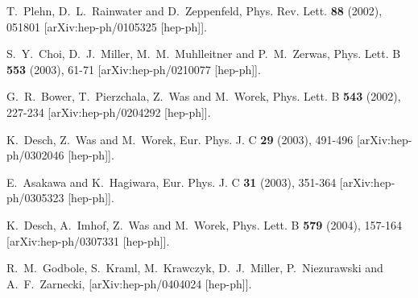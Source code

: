 \documentclass[pdftex,twocolumn,epjc3]{svjour3}          %
\begin{document}
\begin{thebibliography}{9}
T.~Plehn, D.~L.~Rainwater and D.~Zeppenfeld,
Phys. Rev. Lett. \textbf{88} (2002), 051801
[arXiv:hep-ph/0105325 [hep-ph]].

S.~Y.~Choi, D.~J.~Miller, M.~M.~Muhlleitner and P.~M.~Zerwas,
Phys. Lett. B \textbf{553} (2003), 61-71
[arXiv:hep-ph/0210077 [hep-ph]].

G.~R.~Bower, T.~Pierzchala, Z.~Was and M.~Worek,
Phys. Lett. B \textbf{543} (2002), 227-234
[arXiv:hep-ph/0204292 [hep-ph]].

K.~Desch, Z.~Was and M.~Worek,
Eur. Phys. J. C \textbf{29} (2003), 491-496
[arXiv:hep-ph/0302046 [hep-ph]].

E.~Asakawa and K.~Hagiwara,
Eur. Phys. J. C \textbf{31} (2003), 351-364
[arXiv:hep-ph/0305323 [hep-ph]].

K.~Desch, A.~Imhof, Z.~Was and M.~Worek,
Phys. Lett. B \textbf{579} (2004), 157-164
[arXiv:hep-ph/0307331 [hep-ph]].

R.~M.~Godbole, S.~Kraml, M.~Krawczyk, D.~J.~Miller, P.~Niezurawski and A.~F.~Zarnecki,
[arXiv:hep-ph/0404024 [hep-ph]].


\end{thebibliography}
\end{document}

